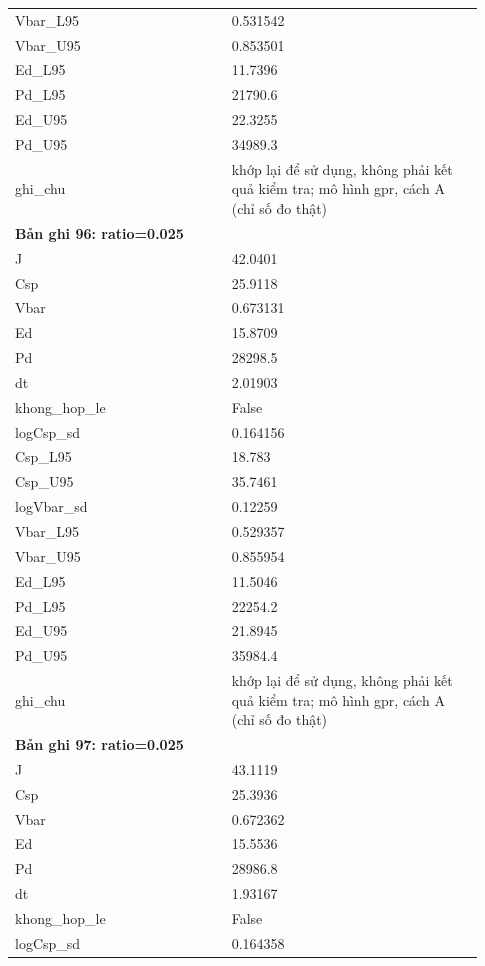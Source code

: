\begin{longtable}{p{0.43\linewidth}p{0.50\linewidth}}
Vbar\_\allowbreak L95 & 0.531542 \\
Vbar\_\allowbreak U95 & 0.853501 \\
Ed\_\allowbreak L95 & 11.7396 \\
Pd\_\allowbreak L95 & 21790.6 \\
Ed\_\allowbreak U95 & 22.3255 \\
Pd\_\allowbreak U95 & 34989.3 \\
ghi\_\allowbreak chu & khớp lại để sử dụng, không phải kết quả kiểm tra; mô hình gpr, cách A (chỉ số đo thật) \\
\midrule
\multicolumn{2}{p{0.95\linewidth}}{\textbf{Bản ghi 96: ratio=0.025}} \\
J & 42.0401 \\
Csp & 25.9118 \\
Vbar & 0.673131 \\
Ed & 15.8709 \\
Pd & 28298.5 \\
dt & 2.01903 \\
khong\_\allowbreak hop\_\allowbreak le & False \\
logCsp\_\allowbreak sd & 0.164156 \\
Csp\_\allowbreak L95 & 18.783 \\
Csp\_\allowbreak U95 & 35.7461 \\
logVbar\_\allowbreak sd & 0.12259 \\
Vbar\_\allowbreak L95 & 0.529357 \\
Vbar\_\allowbreak U95 & 0.855954 \\
Ed\_\allowbreak L95 & 11.5046 \\
Pd\_\allowbreak L95 & 22254.2 \\
Ed\_\allowbreak U95 & 21.8945 \\
Pd\_\allowbreak U95 & 35984.4 \\
ghi\_\allowbreak chu & khớp lại để sử dụng, không phải kết quả kiểm tra; mô hình gpr, cách A (chỉ số đo thật) \\
\midrule
\multicolumn{2}{p{0.95\linewidth}}{\textbf{Bản ghi 97: ratio=0.025}} \\
J & 43.1119 \\
Csp & 25.3936 \\
Vbar & 0.672362 \\
Ed & 15.5536 \\
Pd & 28986.8 \\
dt & 1.93167 \\
khong\_\allowbreak hop\_\allowbreak le & False \\
logCsp\_\allowbreak sd & 0.164358 \\

\end{longtable}
